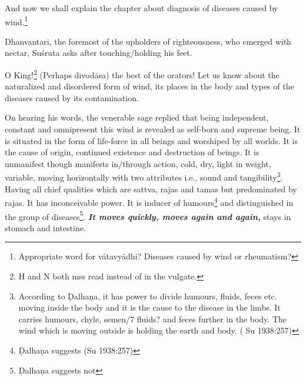 \begin{translation}
    
\item [1] And now we shall explain the chapter about diagnosis of
diseases caused by wind.\footnote{ Appropriate word for vātavyādhi?
    Diseases caused by wind or rheumatism?}
    
\item[2]
    
\item[3] Dhanvantari, the foremost of the upholders of righteousness, who
emerged with nectar, Suśruta asks after touching/holding his
feet.
    
\item[4] O King!\footnote{ H and N both mss read instead of
     in the vulgate.} (Perhaps divodāsa) the best of the orators! Let us know about
    the naturalized and disordered form of wind, its places in the body and
    types of the diseases caused by its contamination.
        
\item[5--9ab] On hearing his words, the venerable sage replied that being
independent, constant and omnipresent this wind is revealed as self-born
and supreme being. It is situated in the form of life-force in all beings
and worshiped by all worlds. It is the cause of origin, continued
existence and destruction of beings. It is unmanifest though manifests
in/through action, cold, dry, light in weight, variable, moving
horizontally with two attributes i.e., sound and
tangibility\footnote{According to Ḍalhaṇa, it has power to divide
    humours, fluids, feces etc. moving inside the body and it is the cause to
    the disease in the limbs. It carries humours, chyle, semen/7 fluids? and
    feces further in the body. The wind which is moving outside is holding
    the earth and body. (      Su 1938:257)}. Having all
    chief qualities which are sattva, rajas and tamas but predominated by
    rajas. It has inconceivable power. It is inducer of humours\footnote{
        Ḍalhaṇa suggests  (Su 1938:257)} and distinguished in
        the group of diseases\footnote{ Ḍalhaṇa suggests  not 
            }. \emph{\textbf{It move}\textbf{s quickly, moves again and
                    again, }}stays in stomach and intestine.
                    

\end{translation}
